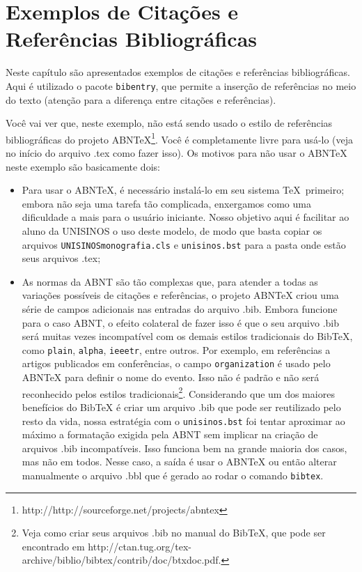 \chapter{Exemplos de Citações e Referências Bibliográficas}
\nobibliography* %
Neste capítulo são apresentados exemplos de citações e referências bibliográficas.  Aqui é utilizado o pacote \texttt{bibentry}, que permite a inserção de referências no meio do texto (atenção para a diferença entre citações e referências).

Você vai ver que, neste exemplo, não está sendo usado o estilo de referências bibliográficas do projeto ABNTeX\footnote{http://http://sourceforge.net/projects/abntex}.  Você é completamente livre para usá-lo (veja no início do arquivo .tex como fazer isso).  Os motivos para não usar o ABNTeX neste exemplo são basicamente dois:
\begin{itemize}
	\item Para usar o ABNTeX, é necessário instalá-lo em seu sistema \TeX\ primeiro; embora não seja uma tarefa tão complicada, enxergamos como uma dificuldade a mais para o usuário iniciante.  Nosso objetivo aqui é facilitar ao aluno da UNISINOS o uso deste modelo, de modo que basta copiar os arquivos \texttt{UNISINOSmonografia.cls} e \texttt{unisinos.bst} para a pasta onde estão seus arquivos .tex;
	\item As normas da ABNT são tão complexas que, para atender a todas as variações possíveis de citações e referências, o projeto ABNTeX criou uma série de campos adicionais nas entradas do arquivo .bib.  Embora funcione para o caso ABNT, o efeito colateral de fazer isso é que o seu arquivo .bib será muitas vezes incompatível com os demais estilos tradicionais do BibTeX, como \texttt{plain}, \texttt{alpha}, \texttt{ieeetr}, entre outros.  Por exemplo, em referências a artigos publicados em conferências, o campo \texttt{organization} é usado pelo ABNTeX para definir o nome do evento.  Isso não é padrão e não será reconhecido pelos estilos tradicionais\footnote{Veja como criar seus arquivos .bib no manual do BibTeX, que pode ser encontrado em http://ctan.tug.org/tex-archive/biblio/bibtex/contrib/doc/btxdoc.pdf.}.  Considerando que um dos maiores benefícios do BibTeX é criar um arquivo .bib que pode ser reutilizado pelo resto da vida, nossa estratégia com o \texttt{unisinos.bst} foi tentar aproximar ao máximo a formatação exigida pela ABNT sem implicar na criação de arquivos .bib incompatíveis.  Isso funciona bem na grande maioria dos casos, mas não em todos.  Nesse caso, a saída é usar o ABNTeX ou então alterar manualmente o arquivo .bbl que é gerado ao rodar o comando \texttt{bibtex}.
\end{itemize}

